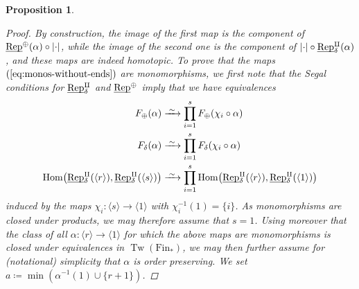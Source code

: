 \documentclass[reqno]{memo-l}
\theoremstyle{mythm}
\newtheorem{prop}[thm]{Proposition}
\theoremstyle{definition}
\numberwithin{equation}{section}
\DeclareMathOperator{\Tw}{Tw}
\renewcommand{\hom}{\textup{hom}}
\renewcommand{\hom}{{\textup{Hom}}}
\newcommand{\ulhelper}[2]{\underline{\setbox0=\hbox{$#1#2$}\dp0=0.4pt \box0\relax}}
\newcommand{\ul}[1]{{\mathpalette\ulhelper{#1}}\hbox{\rule[-2pt]{0pt}{0pt}}}
\newcommand{\iso}{\xrightarrow{\;\smash{\raisebox{-0.25ex}{\ensuremath{\scriptstyle\sim}}}\;}}
\newcommand{\Vect}{\textup{Rep}}
\begin{document}
\begin{prop}
\begin{proof}
        By construction, the image of the first map is the component of $\ul\Vect^\oplus(\alpha)\circ|{\cdot}|$, while the image of the second one is the component of $|{\cdot}|\circ\ul\Vect^\amalg_\delta(\alpha)$, and these maps are indeed homotopic. To prove that the maps $(\ref{eq:monos-without-ends})$ are monomorphisms, we first note that the Segal conditions for $\ul\Vect^\amalg_\delta$ and $\ul\Vect^\oplus$ imply that we have equivalences
        \begin{align*}
            F_\oplus(\alpha)&\iso\prod_{i=1}^s F_\oplus(\chi_i\circ\alpha)\\
            F_\delta(\alpha)&\iso\prod_{i=1}^s F_\delta(\chi_i\circ\alpha)\\
            \hom\big(\ul\Vect^\amalg_\delta(\langle r\rangle), \ul\Vect^\amalg_\delta(\langle s\rangle)\big)&\iso
            \prod_{i=1}^s\hom\big(\ul\Vect^\amalg_\delta(\langle r\rangle), \ul\Vect^\amalg_\delta(\langle 1\rangle)\big)
        \end{align*}
        induced by the maps $\chi_i\colon\langle s\rangle\to\langle1\rangle$ with $\chi_i^{-1}(1)=\{i\}$. As monomorphisms are closed under products, we may therefore assume that $s=1$. Using moreover that the class of all $\alpha\colon\langle r\rangle\to\langle1\rangle$ for which the above maps are monomorphisms is closed under equivalences in $\Tw(\text{Fin}_*)$, we may then further assume for (notational) simplicity that $\alpha$ is order preserving. We set $a\coloneqq\min(\alpha^{-1}(1)\cup\{r+1\})$.
        

\end{proof}
\end{prop}
\end{document}
